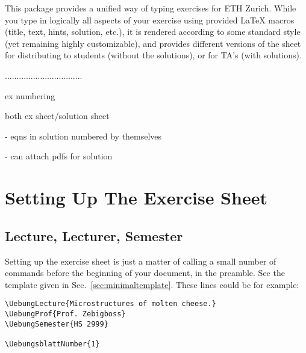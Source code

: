 \documentclass[11pt,a4paper]{article}
\begin{document}
This package provides a unified way of typing exercises for ETH Zurich. While you type in
logically all aspects of your exercise using provided \LaTeX{} macros (title, text, hints,
solution, etc.), it is rendered according to some standard style (yet remaining highly
customizable), and provides different versions of the sheet for distributing to students
(without the solutions), or for TA's (with solutions).

.................................

ex numbering

both ex sheet/solution sheet

  - eqns in solution numbered by themselves

  - can attach pdfs for solution


\section{Setting Up The Exercise Sheet}
\label{sec:SetupSheet}

\subsection{Lecture, Lecturer, Semester}

Setting up the exercise sheet is just a matter of calling a small number of commands
before the beginning of your document, in the preamble. See the template given in
Sec.~\ref{sec:minimaltemplate}. These lines could be for example:
\begin{pkgverbatim}
\begin{verbatim}
\UebungLecture{Microstructures of molten cheese.}
\UebungProf{Prof. Zebigboss}
\UebungSemester{HS 2999}

\UebungsblattNumber{1}
\end{verbatim}
\end{pkgverbatim}




\end{document}
